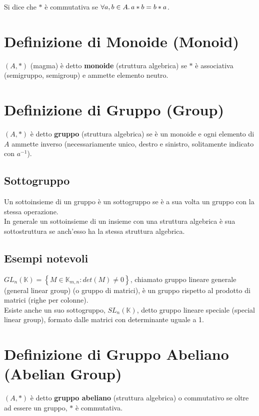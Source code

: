 \documentclass[a4paper, twoside, italian, 11pt]{book}
\newcommand{\braces}[1] {\left\{#1\right\}}
\newcommand{\K}{\mathbb{K}}
\begin{document}
Si dice che $*$ è commutativa se $\forall a,b \in A \ldotp a * b = b * a$.


\section{Definizione di Monoide (Monoid)}

$(A, *)$ (magma) è detto \textbf{monoide} (struttura algebrica) se $*$ è associativa (semigruppo, semigroup) e ammette elemento neutro.


\section{Definizione di Gruppo (Group)}

$(A, *)$ è detto \textbf{gruppo} (struttura algebrica) se è un monoide e ogni elemento di $A$ ammette inverso (necessariamente unico, destro e sinistro, solitamente indicato con $a^{-1}$).


\subsection{Sottogruppo}

Un sottoinsieme di un gruppo è un sottogruppo se è a sua volta un gruppo con la stessa operazione. \\

\noindent
In generale un sottoinsieme di un insieme con una struttura algebrica è sua sottostruttura se anch'esso ha la stessa struttura algebrica.


\subsection{Esempi notevoli}

$GL_n(\K) = \braces{M \in \K_{m,n} : det(M) \neq 0}$, chiamato gruppo lineare generale (general linear group) (o gruppo di matrici), è un gruppo rispetto al prodotto di matrici (righe per colonne). \\

\noindent
Esiste anche un suo sottogruppo, $SL_n(\K)$, detto gruppo lineare speciale (special linear group), formato dalle matrici con determinante uguale a 1.


\section{Definizione di Gruppo Abeliano (Abelian Group)}

$(A, *)$ è detto \textbf{gruppo abeliano} (struttura algebrica) o commutativo se oltre ad essere un gruppo, $*$ è commutativa.
\end{document}
